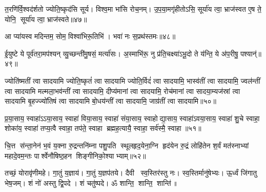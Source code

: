 त॒रणि॑र्वि॒श्वद॑र्\mbox{}शतो ज्योति॒ष्कृद॑सि सूर्य। विश्व॒मा भा॑सि रोच॒नम्। उ॒प॒या॒मगृ॑हीतोऽसि॒ सूर्या॑य त्वा॒ भ्राज॑स्वत ए॒ष ते॒ योनि॒ सूर्या॑य त्वा॒ भ्राज॑स्वते॥४७॥
\anuvakamend

आ प्या॑यस्व मदिन्तम॒ सोम॒ विश्वा॑भिरू॒तिभि॑। भवा॑ नः स॒प्रथ॑स्तमः॥४८॥
\anuvakamend

ई॒युष्टे ये पूर्व॑तरा॒मप॑श्यन् व्यु॒च्छन्ती॑मु॒षसं॒ मर्त्या॑सः। अ॒स्माभि॑रू॒ नु प्र॑ति॒चक्ष्या॑ऽभू॒दो ते य॑न्ति॒ ये अ॑प॒रीषु॒ पश्यान्॑॥४९॥
\anuvakamend

ज्योति॑ष्मतीं त्वा सादयामि ज्योति॒ष्कृतं॑ त्वा सादयामि ज्योति॒र्विदं॑ त्वा सादयामि॒ भास्व॑तीं त्वा सादयामि॒ ज्वल॑न्तीं त्वा सादयामि मल्मला॒भव॑न्तीं त्वा सादयामि॒ दीप्य॑मानां त्वा सादयामि॒ रोच॑मानां त्वा सादया॒म्यज॑स्रां त्वा सादयामि बृ॒हज्ज्यो॑तिषं त्वा सादयामि बो॒धय॑न्तीं त्वा सादयामि॒ जाग्र॑तीं त्वा सादयामि॥५०॥
\anuvakamend

प्र॒या॒साय॒ स्वाहा॑ऽऽया॒साय॒ स्वाहा॑ विया॒साय॒ स्वाहा॑ संया॒साय॒ स्वाहोद्या॒साय॒ स्वाहा॑ऽवया॒साय॒ स्वाहा॑ शु॒चे स्वाहा॒ शोका॑य॒ स्वाहा॑ तप्य॒त्वै स्वाहा॒ तप॑ते॒ स्वाहा ब्रह्मह॒त्यायै॒ स्वाहा॒ सर्व॑स्मै॒ स्वाहा॥५१॥
\anuvakamend

चि॒त्त स॑न्ता॒नेन॑ भ॒वं य॒क्ना रु॒द्रन्तनि॑म्ना पशु॒पति स्थूलहृद॒येना॒ग्नि हृद॑येन रु॒द्रं लोहि॑तेन श॒र्वं मत॑स्नाभ्यां महादे॒वम॒न्तः पार्श्वेनौषिष्ठ॒हन शिङ्गीनिको॒श्याभ्याम्॥५२॥
\anuvakamend

तच्छं॒ योरावृ॑णीमहे। गा॒तुं य॒ज्ञाय॑। गा॒तुं य॒ज्ञप॑तये। 
दैवी स्व॒स्तिर॑स्तु नः। स्व॒स्तिर्मानु॑षेभ्यः। ऊ॒र्ध्वं जि॑गातु भेष॒जम्। 
शं नो॑ अस्तु द्वि॒पदे। शं चतु॑ष्पदे। ॐ शान्ति॒ शान्ति॒ शान्ति॑॥

\closesection
\clearpage